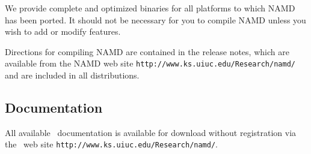 We provide complete and optimized binaries for all
platforms to which NAMD has been ported.
It should not be necessary for you to compile
NAMD unless you wish to add or modify features.

Directions for compiling NAMD are contained in the release notes,
which are available from the NAMD web site
{\tt http://www.ks.uiuc.edu/Research/namd/}
and are included in all distributions.

\subsection{Documentation}

All available \NAMD\ documentation is available for download without
registration via the \NAMD\ web site
{\tt http://www.ks.uiuc.edu/Research/namd/}.


